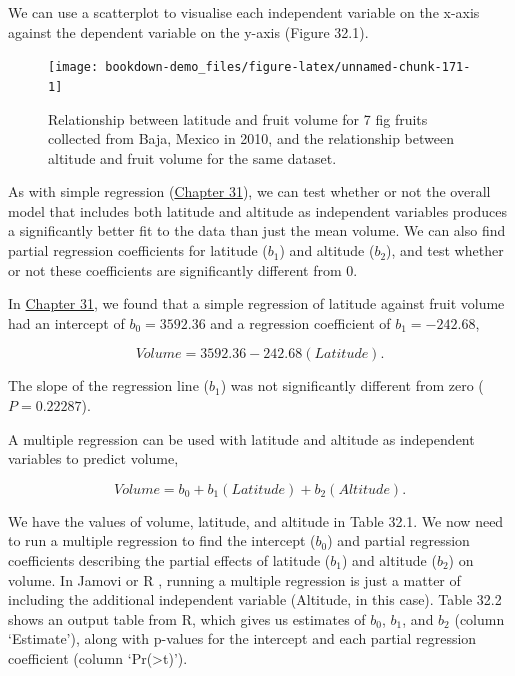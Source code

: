 \documentclass[
]{scrbook}
\begin{document}
We can use a scatterplot to visualise each independent variable on the x-axis against the dependent variable on the y-axis (Figure 32.1).

\begin{figure}
\texttt{[image: bookdown-demo\_files/figure-latex/unnamed-chunk-171-1]} \caption{Relationship between latitude and fruit volume for 7 fig fruits collected from Baja, Mexico in 2010, and the relationship between altitude and fruit volume for the same dataset. }\label{fig:unnamed-chunk-171}
\end{figure}

As with simple regression (\protect\hyperlink{Chapter_31}{Chapter 31}), we can test whether or not the overall model that includes both latitude and altitude as independent variables produces a significantly better fit to the data than just the mean volume.
We can also find partial regression coefficients for latitude (\(b_{1}\)) and altitude (\(b_{2}\)), and test whether or not these coefficients are significantly different from 0.

In \protect\hyperlink{Chapter_31}{Chapter 31}, we found that a simple regression of latitude against fruit volume had an intercept of \(b_{0} = 3592.36\) and a regression coefficient of \(b_{1} = -242.68\),

\[Volume = 3592.36 - 242.68(Latitude).\]

The slope of the regression line (\(b_{1}\)) was not significantly different from zero (\(P = 0.22287\)).

A multiple regression can be used with latitude and altitude as independent variables to predict volume,

\[Volume = b_{0} + b_{1}(Latitude) + b_{2}(Altitude).\]

We have the values of volume, latitude, and altitude in Table 32.1.
We now need to run a multiple regression to find the intercept (\(b_{0}\)) and partial regression coefficients describing the partial effects of latitude (\(b_{1}\)) and altitude (\(b_{2}\)) on volume.
In Jamovi or R \citep{Jamovi2022, Rproject}, running a multiple regression is just a matter of including the additional independent variable (Altitude, in this case).
Table 32.2 shows an output table from R, which gives us estimates of \(b_{0}\), \(b_{1}\), and \(b_{2}\) (column `Estimate'), along with p-values for the intercept and each partial regression coefficient (column `Pr(\textgreater\textbar t\textbar)').
\end{document}
